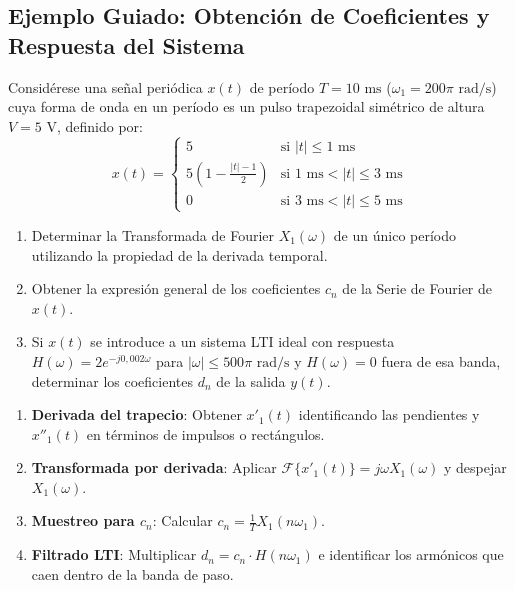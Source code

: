 \newpage

\subsection{Ejemplo Guiado: Obtención de Coeficientes y Respuesta del Sistema}

\begin{problema}
Considérese una señal periódica $x(t)$ de período $T = 10\text{ ms}$ ($\omega_1 = 200\pi\text{ rad/s}$) cuya forma de onda en un período es un pulso trapezoidal simétrico de altura $V = 5\text{ V}$, definido por:
\[
x(t) = \begin{cases}
5 & \text{si } |t| \le 1\text{ ms} \\
5 \left(1 - \frac{|t|-1}{2}\right) & \text{si } 1\text{ ms} < |t| \le 3\text{ ms} \\
0 & \text{si } 3\text{ ms} < |t| \le 5\text{ ms}
\end{cases}
\]

\begin{enumerate}[label=\alph*)]
    \item Determinar la Transformada de Fourier $X_1(\omega)$ de un único período utilizando la propiedad de la derivada temporal.
    \item Obtener la expresión general de los coeficientes $c_n$ de la Serie de Fourier de $x(t)$.
    \item Si $x(t)$ se introduce a un sistema LTI ideal con respuesta $H(\omega) = 2 e^{-j 0{,}002 \omega}$ para $|\omega| \le 500\pi\text{ rad/s}$ y $H(\omega) = 0$ fuera de esa banda, determinar los coeficientes $d_n$ de la salida $y(t)$.
\end{enumerate}
\end{problema}

\begin{mecanizado}
\begin{enumerate}
    \item \textbf{Derivada del trapecio}: Obtener $x'_1(t)$ identificando las pendientes y $x''_1(t)$ en términos de impulsos o rectángulos.
    \item \textbf{Transformada por derivada}: Aplicar $\mathcal{F}\{x'_1(t)\} = j\omega X_1(\omega)$ y despejar $X_1(\omega)$.
    \item \textbf{Muestreo para $c_n$}: Calcular $c_n = \frac{1}{T} X_1(n\omega_1)$.
    \item \textbf{Filtrado LTI}: Multiplicar $d_n = c_n \cdot H(n\omega_1)$ e identificar los armónicos que caen dentro de la banda de paso.
\end{enumerate}
\end{mecanizado}

